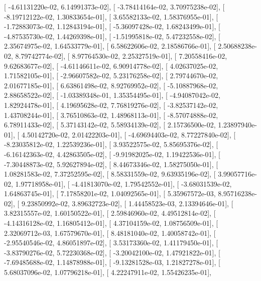 \documentclass{article}
\begin{document}
       [ -4.61131220e-02,   6.14991373e-02],
       [ -3.78414164e-02,   3.70975238e-02],
       [ -8.19712122e-02,   1.30833654e-01],
       [  3.65582133e-02,   1.58376955e-01],
       [ -1.72883073e-02,   1.12843194e-01],
       [ -5.36097428e-02,   1.68243499e-01],
       [ -4.87535730e-02,   1.44269398e-01],
       [ -1.51995818e-02,   5.47232558e-02],
       [  2.35674975e-02,   1.64533779e-01],
       [  6.58622606e-02,   2.18586766e-01],
       [  2.50688238e-02,   8.79742774e-02],
       [  8.97764530e-02,   2.25327519e-01],
       [  7.20558416e-02,   9.62683677e-02],
       [ -4.61146611e-02,   6.90914778e-02],
       [  4.02637025e-02,   1.71582105e-01],
       [ -2.96607582e-02,   5.23176258e-02],
       [  2.79744670e-02,   2.01677185e-01],
       [  6.63861498e-02,   8.92769952e-02],
       [ -5.10887968e-02,   2.88658522e-02],
       [ -1.03389348e-01,   1.35354495e-01],
       [ -4.94087042e-02,   1.82924478e-01],
       [  4.19695628e-02,   7.76819276e-02],
       [ -3.82537142e-02,   1.43708244e-01],
       [  3.76510863e-02,   1.48968113e-01],
       [ -8.57074888e-02,   6.78911433e-02],
       [  5.37143142e-02,   5.58934139e-02],
       [  2.15736500e-02,   1.23897940e-01],
       [  4.50142720e-02,   2.01422203e-01],
       [ -4.69694403e-02,   8.77227840e-02],
       [ -8.23035812e-02,   1.22539236e-01],
       [  3.93522575e-02,   5.85695376e-02],
       [ -6.16142363e-02,   4.42863505e-02],
       [ -9.91982025e-02,   1.19422536e-01],
       [ -7.30448873e-02,   5.92627894e-02],
       [  8.44673346e-02,   1.58275050e-01],
       [  1.08281583e-02,   7.37252595e-02],
       [  8.58331559e-02,   9.63935196e-02],
       [  3.99057716e-02,   1.97718958e-01],
       [ -4.41813070e-02,   1.79542552e-01],
       [ -3.68031539e-02,   1.64863745e-01],
       [  7.17858201e-02,   1.04092565e-01],
       [  5.35967572e-03,   8.95716238e-02],
       [  9.23850992e-02,   3.89632723e-02],
       [  1.44458523e-03,   2.13394646e-01],
       [  3.82315557e-02,   1.60150522e-01],
       [  2.59846960e-02,   4.49512814e-02],
       [ -4.14316128e-02,   1.16805412e-01],
       [  4.37104159e-02,   1.08756509e-01],
       [  2.32069712e-03,   1.67579670e-01],
       [  8.48181040e-02,   1.40058742e-01],
       [ -2.95540546e-02,   4.86051897e-02],
       [  3.53173360e-02,   1.41179450e-01],
       [ -3.83790276e-02,   5.72230368e-02],
       [ -3.20042100e-02,   1.47921822e-01],
       [ -7.69485688e-02,   1.14878988e-01],
       [ -9.13281528e-03,   1.21827278e-01],
       [  5.68037096e-02,   1.07796218e-01],
       [  4.22247911e-02,   1.55426235e-01],
\end{document}
